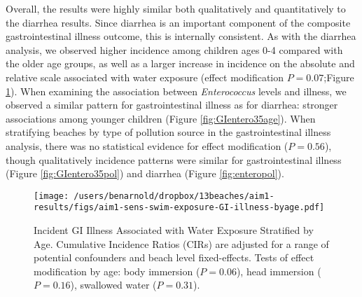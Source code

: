 \documentclass[12pt]{article}\usepackage[]{graphicx}\usepackage[]{color}
\begin{document}
Overall, the results were highly similar both qualitatively and quantitatively to the diarrhea results. Since diarrhea is an important component of the composite gastrointestinal illness outcome, this is internally consistent.  As with the diarrhea analysis, we observed higher incidence among children ages 0-4 compared with the older age groups, as well as a larger increase in incidence on the absolute and relative scale associated with water exposure (effect modification $P=0.07$;Figure \ref{fig:GIswimex}).  When examining the association between \textit{Enterococcus} levels and illness, we observed a similar pattern for gastrointestinal illness as for diarrhea: stronger associations among younger children (Figure \ref{fig:GIentero35age}). When stratifying beaches by type of pollution source in the gastrointestinal illness analysis, there was no statistical evidence for effect modification ($P=0.56$), though qualitatively incidence patterns were similar for gastrointestinal illness (Figure \ref{fig:GIentero35pol}) and diarrhea (Figure \ref{fig:enteropol}).

\begin{landscape}
\begin{figure}[htbp]
\begin{center}
\texttt{[image: /users/benarnold/dropbox/13beaches/aim1-results/figs/aim1-sens-swim-exposure-GI-illness-byage.pdf]}
\begin{minipage}{1.2\textwidth}
\caption{Incident GI Illness Associated with Water Exposure Stratified by Age. Cumulative Incidence Ratios (CIRs) are adjusted for a range of potential confounders and beach level fixed-effects. Tests of effect modification by age: body immersion ($P=0.06$), head immersion ($P=0.16$), swallowed water ($P=0.31$).}
\label{fig:GIswimex}
\end{minipage}
\end{center}
\end{figure}
\end{landscape}
\end{document}
